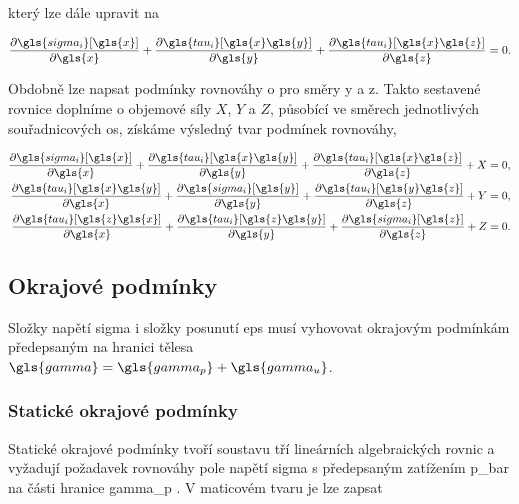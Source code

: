 který lze dále upravit na

\begin{equation}
    \pdv{\gls{sigma_i}[\gls{x}]}{\gls{x}}
    +
    \pdv{\gls{tau_i}[\gls{x}\gls{y}]}{\gls{y}}
    +
    \pdv{\gls{tau_i}[\gls{x}\gls{z}]}{\gls{z}}
    = 0.
\end{equation}

Obdobně lze napsat podmínky rovnováhy o pro směry \gls{y} a \gls{z}. Takto sestavené rovnice doplníme o objemové síly $X$, $Y$ a $Z$, působící ve směrech jednotlivých souřadnicových os, získáme výsledný tvar podmínek rovnováhy,

\begin{equation}
    \begin{aligned}
        \pdv{\gls{sigma_i}[\gls{x}]}{\gls{x}}
        +
        \pdv{\gls{tau_i}[\gls{x}\gls{y}]}{\gls{y}}
        +
        \pdv{\gls{tau_i}[\gls{x}\gls{z}]}{\gls{z}}
        + X & = 0, \\
        \pdv{\gls{tau_i}[\gls{x}\gls{y}]}{\gls{x}}
        +
        \pdv{\gls{sigma_i}[\gls{y}]}{\gls{y}}
        +
        \pdv{\gls{tau_i}[\gls{y}\gls{z}]}{\gls{z}}
        + Y & = 0, \\
        \pdv{\gls{tau_i}[\gls{z}\gls{x}]}{\gls{x}}
        +
        \pdv{\gls{tau_i}[\gls{z}\gls{y}]}{\gls{y}}
        +
        \pdv{\gls{sigma_i}[\gls{z}]}{\gls{z}}
        + Z & = 0.
    \end{aligned}
\end{equation}

\subsection{Okrajové podmínky}

Složky napětí \gls{sigma} i složky posunutí \gls{eps} musí vyhovovat okrajovým podmínkám předepsaným na hranici tělesa $\gls{gamma} = \gls{gamma_p} + \gls{gamma_u}$.

\subsubsection*{Statické okrajové podmínky}
Statické okrajové podmínky tvoří soustavu tří lineárních algebraických rovnic a vyžadují požadavek rovnováhy pole napětí \gls{sigma} s předepsaným zatížením \gls{p_bar} na části hranice \gls{gamma_p} \cite[35]{prpe10}. V maticovém tvaru je lze zapsat

